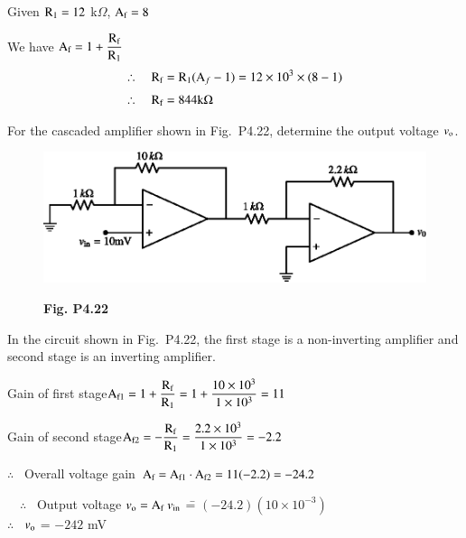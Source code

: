 \begin{solution}
Given $\textrm{R}_{1}=12$ k$\Omega$, $\textrm{A}_{\textrm{f}}=8$

\medskip
We have $\textrm{A}_{\textrm{f}}=1+\dfrac{\textrm{R}_{\textrm{f}}}{\textrm{R}_{1}}$
\begin{align*}
\therefore\quad \textrm{R}_{\textrm{f}} &= \textrm{R}_{1}(\textrm{A}_{f}-1)= 12\times 10^{3}\times (8-1)\\[3pt]
\therefore\quad \textrm{R}_{\textrm{f}} &= 844 \textrm{k} \Omega
\end{align*}
\end{solution}

\begin{problem}\label{prob4.22}
For the cascaded amplifier shown in Fig.~P4.22, determine the output voltage $v_{\textrm{o}}$.
\begin{figure}[H]
\centering
\includegraphics[scale=.95]{chap4/figP4.22.eps}

\smallskip
{\bf Fig. P4.22}
\end{figure}
\end{problem}

\vfill\eject

\begin{solution}
In the circuit shown in Fig.~P4.22, the first stage is a non-inverting amplifier and second stage is an inverting amplifier.

\medskip
Gain of first stage\quad $\textrm{A}_{\textrm{f} 1}=1+\dfrac{\textrm{R}_{\textrm{f}}}{\textrm{R}_{1}}=1+\dfrac{10\times 10^{3}}{1\times 10^{3}}=11$

\medskip
Gain of second stage\quad $\textrm{A}_{\textrm{f} 2}=-\dfrac{\textrm{R}_{\textrm{f}}}{\textrm{R}_{1}}=\dfrac{2.2\times 10^{3}}{1\times 10^{3}}=-2.2$

\medskip
$\therefore$~ Overall voltage gain $\textrm{A}_{\textrm{f}}=\textrm{A}_{\textrm{f} 1}\cdot \textrm{A}_{\textrm{f} 2}=11(-2.2)=-24.2$

\medskip
\begin{tabbing}
\quad~~$\therefore$~ Output voltage $v_{\textrm{o}}=\textrm{A}_{\textrm{f}}~v_{\text{in}}$ \== $(-24.2)(10\times 10^{-3})$\\[4pt]
\phantom{AAiAAAAAAAAAAAAA} $\therefore$~ $v_{\textrm{o}}$ \>= $-242$ mV
\end{tabbing}
\end{solution}

